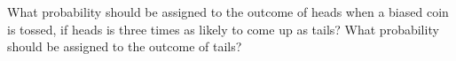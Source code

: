 \documentclass[../main.tex]{subfiles}
\begin{document}
What probability should be assigned to the outcome of heads when a biased coin is tossed, if heads is three times as likely to come up as tails?
What probability should be assigned to the outcome of tails?

\solution
\end{document}
